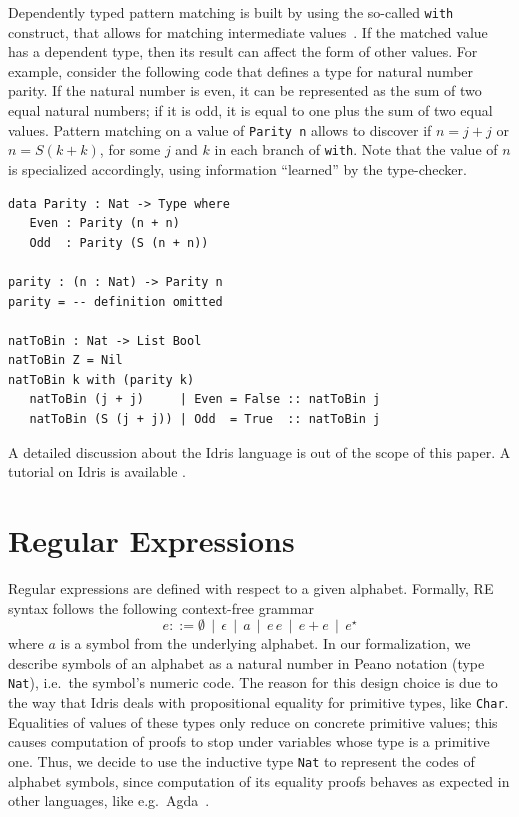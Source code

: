 \documentclass{llncs}
\newcommand{\idris}[1]{\texttt{#1}}%
\begin{document}
Dependently typed pattern matching is built by using the so-called
\idris{with} construct, that allows for matching intermediate
values~\cite{McBride2004}. If the matched value has a dependent type,
then its result can affect the form of other values. For example,
consider the following code that defines a type for natural number
parity. If the natural number is even, it can be represented as the
sum of two equal natural numbers; if it is odd, it is equal to one
plus the sum of two equal values. Pattern matching on a value of
\idris{Parity n} allows to discover if $n = j + j$ or $n = S (k + k)$,
for some $j$ and $k$ in each branch of \idris{with}.  Note that the
value of $n$ is specialized accordingly, using information ``learned''
by the type-checker.
\begin{verbatim}
data Parity : Nat -> Type where
   Even : Parity (n + n)
   Odd  : Parity (S (n + n))

parity : (n : Nat) -> Parity n
parity = -- definition omitted

natToBin : Nat -> List Bool
natToBin Z = Nil
natToBin k with (parity k)
   natToBin (j + j)     | Even = False :: natToBin j
   natToBin (S (j + j)) | Odd  = True  :: natToBin j
\end{verbatim}

A detailed discussion about the Idris language is out of the scope of
this paper. A tutorial on Idris is available \cite{idris-tutorial}.

\section{Regular Expressions}\label{sec:regexp}

Regular expressions are defined with respect to a given
alphabet. Formally, RE syntax follows the following context-free
grammar
\[
e ::= \emptyset\,\mid\,\epsilon\,\mid\,a\,\mid\,e\,e\,\mid\,e+e\,\mid\,e^{\star}
\]
where $a$ is a symbol from the underlying alphabet.  In our
formalization, we describe symbols of an alphabet as a natural number
in Peano notation (type \idris{Nat}), i.e.~the symbol's numeric
code. The reason for this design choice is due to the way that Idris
deals with propositional equality for primitive types, like
\idris{Char}. Equalities of values of these types only reduce on
concrete primitive values; this causes computation of proofs to stop
under variables whose type is a primitive one. Thus, we decide to use
the inductive type \idris{Nat} to represent the codes of alphabet
symbols, since computation of its equality proofs behaves as expected
in other languages, like e.g.~Agda~\cite{Norell2009}.
\end{document}
